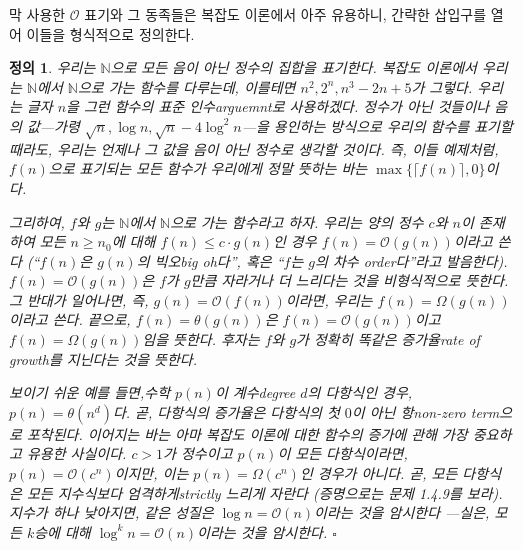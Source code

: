 \documentclass[a4paper,chapter,atbegshi,]{oblivoir}
\newtheorem{defn}{정의}[chapter]
\begin{document}
막 사용한 $\mathcal{O}$ 표기와 그 동족들은 복잡도 이론에서 아주 유용하니, 
간략한 삽입구를 열어 이들을 형식적으로 정의한다.

\begin{defn}\normalfont
  우리는 $\mathbb{N}$으로 모든 음이 아닌 정수의 집합을 표기한다. 복잡도
  이론에서 우리는 $\mathbb{N}$에서 $\mathbb{N}$으로 가는 함수를 다루는데,
  이를테면 $n^2,2^n,n^3-2n+5$가 그렇다. 우리는 글자 $n$을 그런 함수의 표준
  인수{\footnotesize arguemnt}로 사용하겠다. 정수가 아닌 것들이나 음의 
  값---가령 $\sqrt{n},\log n, \sqrt{n}-4\log^2n$---을 용인하는 방식으로 
  우리의 함수를 표기할 때라도, 우리는 언제나 그 값을 음이 아닌 정수로
  생각할 것이다. 즉, 이들 예제처럼, $f(n)$으로 표기되는 모든 함수가 
  우리에게 정말 뜻하는 바는 $\max\{\lceil f(n)\rceil,0\}$이다.

  그리하여, $f$와 $g$는 $\mathbb{N}$에서 $\mathbb{N}$으로 가는 함수라고 하자.
  우리는 양의 정수 $c$와 $n$이 존재하여 모든 $n\geq n_0$에 대해 $f(n)\leq c\cdot
  g(n)$인 경우 $f(n)=\mathcal{O}(g(n))$이라고 쓴다 (``$f(n)$은 $g(n)$의
  빅오{\footnotesize big oh}다'', 혹은 ``$f$는 $g$의 차수{\footnotesize 
  order}다''라고 발음한다). $f(n)=\mathcal{O}(g(n))$은 $f$가 $g$만큼
  자라거나 더 느리다는 것을 비형식적으로 뜻한다. 그 반대가 일어나면,
  즉, $g(n)=\mathcal{O}(f(n))$이라면, 우리는 $f(n)=\Omega(g(n))$이라고 쓴다.  
  끝으로, $f(n)=\theta(g(n))$은 $f(n)=\mathcal{O}(g(n))$이고 
  $f(n)=\Omega(g(n))$임을 뜻한다. 후자는 $f$와 $g$가 정확히 똑같은 
  \emph{증가율\footnotesize rate of growth}를 지닌다는 것을 뜻한다. 

  보이기 쉬운 예를 들면,수학 $p(n)$이 계수{\footnotesize degree} $d$의
  다항식인 경우, $p(n)=\theta(n^d)$다. 곧, 다항식의 증가율은 다항식의
  첫 $0$이 아닌 항{\footnotesize non-zero term}으로 포착된다. 이어지는 바는
  아마 복잡도 이론에 대한 함수의 증가에 관해 가장 중요하고 유용한 사실이다. 
  $c>1$가 정수이고 $p(n)$이 모든 다항식이라면, $p(n)=\mathcal{O}(c^n)$이지만, 
  이는 $p(n)=\Omega(c^n)$인 경우가 아니다. 곧, \emph{모든 다항식은 모든 지수식보다
  엄격하게{\footnotesize strictly} 느리게 자란다} (증명으로는 문제 1.4.9를 보라).
  지수가 하나 낮아지면, 같은 성질은 $\log n=\mathcal{O}(n)$이라는 것을 암시한다
  ---실은, 모든 $k$승에 대해 $\log^k n=\mathcal{O}(n)$이라는 것을 암시한다. 
  $\square$
\end{defn}
\end{document}
